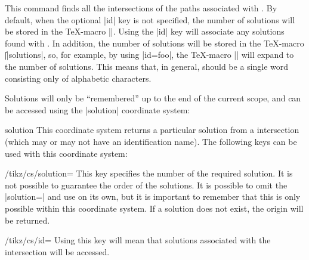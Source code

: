 \begin{command}{\tikzintersectnamedpaths\opt{|[id=|\meta{name}|]|}}
  
  This command finds all the intersections of the paths associated 
  with  . 
  By default, when the optional |id| key is not 
  specified, the number of solutions will be stored in the \TeX-macro 
  |\solutions|. Using the |id| key will associate any solutions
  found with . In addition, the number of solutions will 
  be stored in the \TeX-macro |\||solutions|, so, for 
  example, by using |id=foo|, the \TeX-macro |\foosolutions|  will 
  expand to the number of solutions. This means that, in general, 
   should be a single word consisting only of alphabetic 
  characters.
  
  Solutions will only be ``remembered'' up to the end of the current
  scope, and can be accessed using the |solution| coordinate system:
    
\begin{coordinatesystem}{solution}
  This coordinate system returns a particular solution from 
  a intersection (which may or may not have an identification 
  name). The following keys can be used with this coordinate
  system:

\begin{key}{/tikz/cs/solution=}
  This key specifies the number of the required solution. It is not
  possible to guarantee the order of the solutions. It is possible
  to omit the |solution=| and use  on its own, but it
  is important to remember that this is only possible within this
  coordinate system. If a solution does not exist, the origin will be
  returned.

\begin{codeexample}[]
\end{codeexample}
\end{key}

\begin{key}{/tikz/cs/id=}
  Using this key will mean that solutions associated with the 
  intersection  will be accessed.  
\end{key}


\end{coordinatesystem}
\end{command}
